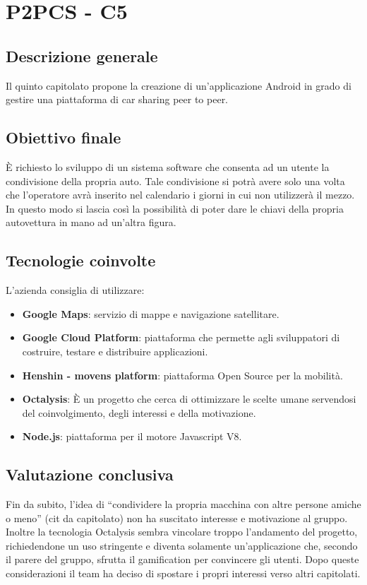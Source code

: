 \section{P2PCS - C5} \label{c5}
    \subsection{Descrizione generale}
    Il quinto capitolato propone la creazione di un'applicazione Android in grado di gestire una piattaforma di car sharing peer to peer.

    \subsection{Obiettivo finale}
    È richiesto lo sviluppo di un sistema software che consenta ad un utente la condivisione della propria auto. Tale condivisione si potrà avere solo una volta che l'operatore avrà inserito nel calendario i giorni in cui non utilizzerà il mezzo.
    In questo modo si lascia così la possibilità di poter dare le chiavi della propria autovettura in mano ad un'altra figura.

    \subsection{Tecnologie coinvolte}
	L'azienda consiglia di utilizzare:
    	\begin{itemize}
    		\item \textbf{Google Maps}: servizio di mappe e navigazione satellitare.
			\item \textbf{Google Cloud Platform}: piattaforma che permette agli sviluppatori di costruire, testare e distribuire applicazioni.
			\item \textbf{Henshin - movens platform}: piattaforma Open Source per la mobilità.
			\item \textbf{Octalysis}: È un progetto che cerca di ottimizzare le scelte umane servendosi del coinvolgimento, degli interessi e della motivazione.
			\item \textbf{Node.js}: piattaforma per il motore Javascript V8.
	\end{itemize}
	
    \subsection{Valutazione conclusiva}
    Fin da subito, l'idea di ``condividere la propria macchina con altre persone amiche o meno'' (cit da capitolato) non ha suscitato interesse e motivazione al gruppo. Inoltre la tecnologia Octalysis sembra vincolare troppo l'andamento del progetto, richiedendone un uso stringente e diventa solamente un'applicazione che, secondo il parere del gruppo, sfrutta il gamification per convincere gli utenti. Dopo queste considerazioni il team ha deciso di spostare i propri interessi verso altri capitolati.
